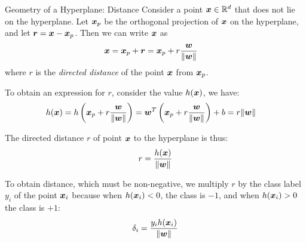 \begin{frame}{Geometry of a Hyperplane: Distance}
\small
  Consider a point ${\boldsymbol x} \in {\mathord{\mathbb R}}^d$ that does not lie
on the hyperplane. Let ${\boldsymbol x}_p$ be the orthogonal projection of ${\boldsymbol x}$ on
the hyperplane, and let ${\boldsymbol r} = {\boldsymbol x} - {\boldsymbol x}_p$.
Then we can write ${\boldsymbol x}$ as
\begin{align*}
    {\boldsymbol x}  & = {\boldsymbol x}_p + {\boldsymbol r} = 
	{\boldsymbol x}_p + r {{\boldsymbol w} \over \|{\boldsymbol w}\|}
\end{align*}
where $r$ is the {\em directed distance} of the point ${\boldsymbol x}$ from
${\boldsymbol x}_p$.  

To obtain an expression for $r$, consider the value $h({\boldsymbol x})$, we have:
\begin{align*}
  h({\boldsymbol x}) & = h\left({\boldsymbol x}_p + r {{\boldsymbol w} \over \|{\boldsymbol w}\|}\right) = 
  {\boldsymbol w}^T\left({\boldsymbol x}_p + r {{\boldsymbol w} \over \|{\boldsymbol w}\|}\right) + b = 
  r \| {\boldsymbol w} \|
\end{align*}

The directed distance $r$ of point ${\boldsymbol x}$ to the
hyperplane is thus:
\begin{align*}
  r = {h({\boldsymbol x}) \over \| {\boldsymbol w} \|}
\end{align*}

To obtain distance, which must be non-negative, we 
multiply $r$ by the class label $y_i$ of the point ${\boldsymbol x}_i$
because when $h({\boldsymbol x}_i) < 0$, the class is $-1$, and when $h({\boldsymbol x}_i)
> 0$ the class is $+1$:
\begin{align*}
  \delta_i = {y_i h({\boldsymbol x}_i) \over \| {\boldsymbol w} \|}
\end{align*}


\end{frame}





